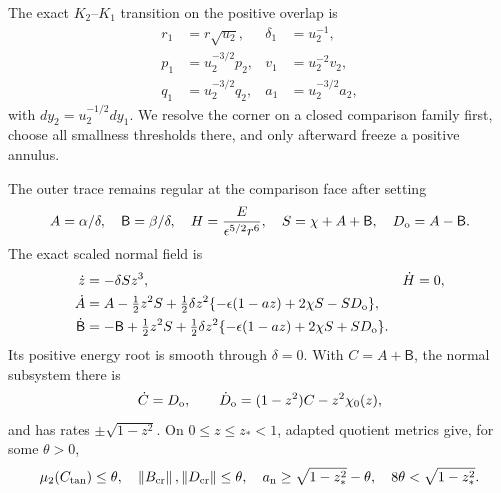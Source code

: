 \documentclass[11pt,reqno]{amsart}
\numberwithin{equation}{section}
\theoremstyle{definition}
\theoremstyle{remark}
\newcommand{\norm}[1]{\left\lVert #1\right\rVert}
\begin{document}
The exact $K_2$--$K_1$ transition on the positive overlap is
\begin{equation}\label{eq:K2-K1}
 \begin{aligned}
 r_1&=r\sqrt{u_2},& \delta_1&=u_2^{-1},\\
 p_1&=u_2^{-3/2}p_2,& v_1&=u_2^{-2}v_2,\\
 q_1&=u_2^{-3/2}q_2,& a_1&=u_2^{-3/2}a_2,
 \end{aligned}
\end{equation}
with $dy_2=u_2^{-1/2}dy_1$.  We resolve the corner on a closed comparison
family first, choose all smallness thresholds there, and only afterward
freeze a positive annulus.

The outer trace remains regular at the comparison face after setting
\begin{equation}\label{eq:scaled-outer}
 A=\alpha/\delta,\quad \mathsf B=\beta/\delta,\quad
 H=\frac{E}{\epsilon^{5/2}r^6},\quad
 S=\chi+A+\mathsf B,\quad D_{\rm o}=A-\mathsf B .
\end{equation}
The exact scaled normal field is
\begin{equation}\label{eq:scaled-outer-field}
 \begin{aligned}
  \dot z&=-\delta Sz^3,& \dot H&=0,\\
  \dot A&=A-\tfrac12z^2S
   +\tfrac12\delta z^2\{-\epsilon(1-az)+2\chi S-SD_{\rm o}\},\\
  \dot{\mathsf B}&=-\mathsf B+\tfrac12z^2S
   +\tfrac12\delta z^2\{-\epsilon(1-az)+2\chi S+SD_{\rm o}\}.
 \end{aligned}
\end{equation}
Its positive energy root is smooth through $\delta=0$.  With
$C=A+\mathsf B$, the normal subsystem there is
\[
 \dot C=D_{\rm o},\qquad
 \dot D_{\rm o}=(1-z^2)C-z^2\chi_0(z),
\]
and has rates $\pm\sqrt{1-z^2}$.  On $0\le z\le z_*<1$, adapted quotient
metrics give, for some $\theta>0$,
\begin{equation}\label{eq:outer-corner-gap}
 \mu_2(C_{\rm tan})\le\theta,\quad
 \norm{B_{\rm cr}},\norm{D_{\rm cr}}\le\theta,\quad
 a_{\rm n}\ge\sqrt{1-z_*^2}-\theta,\quad
 8\theta<\sqrt{1-z_*^2}.
\end{equation}
\end{document}
